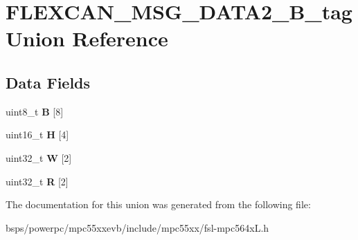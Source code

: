 \hypertarget{unionFLEXCAN__MSG__DATA2__32B__tag}{}\section{F\+L\+E\+X\+C\+A\+N\+\_\+\+M\+S\+G\+\_\+\+D\+A\+T\+A2\+\_\+B\+\_\+tag Union Reference}
\label{unionFLEXCAN__MSG__DATA2__32B__tag}
\subsection*{Data Fields}
\begin{DoxyCompactItemize}
\item 
\mbox{\label{unionFLEXCAN__MSG__DATA2__32B__tag_adb8ac453dcfe06bfa3d19ed2f36a9aed}} 
uint8\+\_\+t {\bfseries B} \mbox{[}8\mbox{]}
\item 
\mbox{\label{unionFLEXCAN__MSG__DATA2__32B__tag_a9c6327c10a1675f3945e5148a335d452}} 
uint16\+\_\+t {\bfseries H} \mbox{[}4\mbox{]}
\item 
\mbox{\label{unionFLEXCAN__MSG__DATA2__32B__tag_a79dd95bd79d3a7faf99498b6ccbd965e}} 
uint32\+\_\+t {\bfseries W} \mbox{[}2\mbox{]}
\item 
\mbox{\label{unionFLEXCAN__MSG__DATA2__32B__tag_a94dadc8edc4e74b6fdd70dbefb3de20c}} 
uint32\+\_\+t {\bfseries R} \mbox{[}2\mbox{]}
\end{DoxyCompactItemize}


The documentation for this union was generated from the following file\+:\begin{DoxyCompactItemize}
\item 
bsps/powerpc/mpc55xxevb/include/mpc55xx/fsl-\/mpc564x\+L.\+h\end{DoxyCompactItemize}
